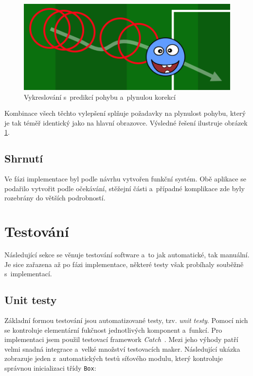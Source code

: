 \documentclass[thesis=B,czech,hidelinks]{FITthesis}[2012/06/26] %
\newcommand{\code}[1]{\texttt{#1}}
\begin{document}
\begin{figure}[h]
\center
\includegraphics[width=\textwidth]{player_rendering_3}
\caption{Vykreslování s~predikcí pohybu a~plynulou korekcí}
\label{picture:player_rendering_3}
\end{figure}

Kombinace všech těchto vylepšení splňuje požadavky na plynulost pohybu, který je tak téměř identický jako na hlavní obrazovce. Výsledné řešení ilustruje obrázek \ref{picture:player_rendering_3}.

\subsection{Shrnutí}

Ve fázi implementace byl podle návrhu vytvořen funkční systém. Obě aplikace se podařilo vytvořit podle očekávání, stěžejní části a~případné komplikace zde byly rozebrány do větších podrobností. 

\section{Testování}
\label{section:testing}

Následující sekce se věnuje testování software a~to jak automatické, tak manuální. Je sice zařazena až po fázi implementace, některé testy však probíhaly souběžně s~implementací. 

\subsection{Unit testy}

Základní formou testování jsou automatizované testy, tzv. \textit{unit testy}. Pomocí nich se kontroluje elementární fukčnost jednotlivých komponent a~funkcí. Pro implementaci jsem použil testovací framework \textit{Catch}~\cite{catch}. Mezi jeho výhody patří velmi snadná integrace a~velké množství testovacích maker. Následující ukázka zobrazuje jeden z~automatických testů síťového modulu, který kontroluje správnou inicializaci třídy \code{Box}:
\end{document}
